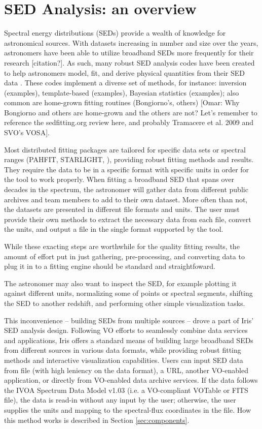 \section{SED Analysis: an overview}
\label{sec:overview}

Spectral energy distributions (SEDs) provide a wealth of knowledge for astronomical sources. With datasets increasing in number and size over the years, astronomers have been able to utilize broadband SEDs more frequently for their research [citation?]. As such, many robust SED analysis codes have been created to help astronomers model, fit, and derive physical quantities from their SED data \cite{2011Ap&SS.331....1W,2013ARA&A..51..393C}. These codes implement a diverse set of methods, for instance: inversion (examples), template-based (examples), Bayesian statistics (examples); also common are home-grown fitting routines (Bongiorno's, others) [Omar: Why Bongiorno and others are home-grown and the others are not? Let's remember to reference the sedfitting.org review here, and probably Tramacere et al. 2009 and SVO's VOSA]. 

Most distributed fitting packages are tailored for specific data sets or spectral ranges (PAHFIT, STARLIGHT, ), providing robust fitting methods and results. They require the data to be in a specific format with specific units in order for the tool to work properly. When fitting a broadband SED that spans over decades in the spectrum, the astronomer will gather data from different public archives and team members to add to their own dataset. More often than not, the datasets are presented in different file formats and units. The user must provide their own methods to extract the necessary data from each file, convert the units, and output a file in the single format supported by the tool.

While these exacting steps are worthwhile for the quality fitting results, the amount of effort put in just gathering, pre-processing, and converting data to plug it in to a fitting engine should be standard and straightfoward.

The astronomer may also want to inspect the SED, for example plotting it against different units, normalizing some of points or spectral segments, shifting the SED to another redshift, and performing other simple visualization tasks.

This inconvenience -- building SEDs from multiple sources -- drove a part of Iris' SED analysis design. Following VO efforts to seamlessly combine data services and applications, Iris offers a standard means of building large broadband SEDs from different sources in various data formats, while providing robust fitting methods and interactive visualization capabilities. Users can input SED data from file (with high leniency on the data format), a URL, another VO-enabled application, or directly from VO-enabled data archive services. If the data follows the IVOA Spectrum Data Model v1.03 (i.e. a VO-compliant VOTable or FITS file), the data is read-in without any input by the user; otherwise, the user supplies the units and  mapping to the spectral-flux coordinates in the file. How this method works is described in Section \ref{sec:components}. 


